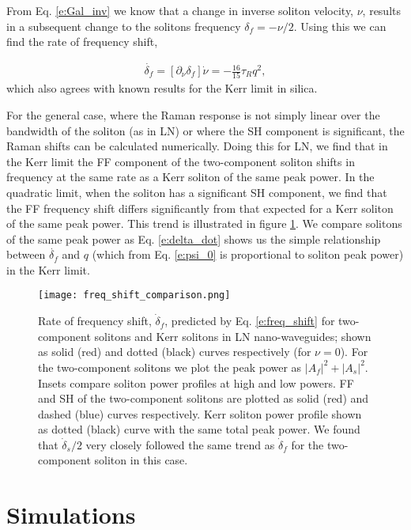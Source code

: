 \documentclass[reprint,
 amsmath,amssymb,
 pra,
]{revtex4-1}
\newcommand{\eq}[1]{
\begin{equation}\begin{aligned}
#1
\end{aligned}\end{equation}}
\begin{document}
From Eq. \eqref{e:Gal_inv} we know that a change in inverse soliton velocity, $\nu$, results in a subsequent change to the solitons frequency $\delta_f = -\nu/2$. Using this we can find the rate of frequency shift,
\eq{\label{e:delta_dot}
\dot{\delta_f} = [\partial_\nu \delta_f] \dot{\nu}= -\frac{16}{15}\tau_R q^2,
}
which also agrees with known results for the Kerr limit in silica\cite{Agrawal2013NonlinearOptics, Skryabin2010TheoryWaves}.

For the general case, where the Raman response is not simply linear over the bandwidth of the soliton (as in LN) or where the SH component is significant, the Raman shifts can be calculated numerically. Doing this for LN, we find that in the Kerr limit the FF component of the two-component soliton shifts in frequency at the same rate as a Kerr soliton of the same peak power. In the quadratic limit, when the soliton has a significant SH component, we find that the FF frequency shift differs significantly from that expected for a Kerr soliton of the same peak power. This trend is illustrated in figure \ref{fig:freq_shift}. We compare solitons of the same peak power as Eq. \eqref{e:delta_dot} shows us the simple relationship between $\dot{\delta_f}$ and $q$ (which from Eq. \eqref{e:psi_0} is proportional to soliton peak power) in the Kerr limit.


\begin{figure}
    \centering
    \texttt{[image: freq\_shift\_comparison.png]}
    \caption{ Rate of frequency shift, $\dot{\delta}_f$, predicted by Eq. \eqref{e:freq_shift} for two-component solitons and Kerr solitons in LN nano-waveguides; shown as solid (red) and dotted (black) curves respectively (for $\nu=0$). For the two-component solitons we plot the peak power as $|A_f|^2 + |A_s|^2$. Insets compare soliton power profiles at high and low powers. FF and SH of the two-component solitons are plotted as solid (red) and dashed (blue) curves respectively. Kerr soliton power profile shown as dotted (black) curve with the same total peak power. We found that $\dot{\delta}_s/2$ very closely followed the same trend as $\dot{\delta}_f$ for the two-component soliton in this case.}
    \label{fig:freq_shift}
\end{figure}

\section{Simulations}
\end{document}
